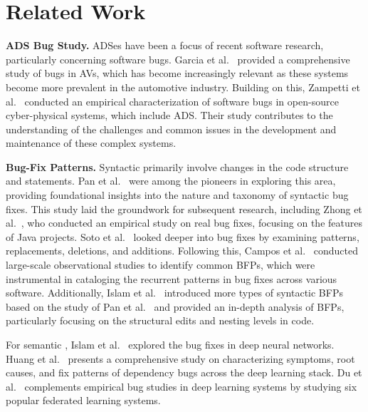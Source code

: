 \section{Related Work}\label{sec:related}

\noindent \textbf{ADS Bug Study.} ADSes have been a focus of recent software research, particularly concerning software bugs. Garcia et al.~\cite{GarciaF0AXC20} provided a comprehensive study of bugs in AVs, which has become increasingly relevant as these systems become more prevalent in the automotive industry. 
Building on this, Zampetti et al.~\cite{ZampettiKPP22} conducted an empirical characterization of software bugs in open-source cyber-physical systems, which include ADS. Their study contributes to the understanding of the challenges and common issues in the development and maintenance of these complex systems.

\noindent \textbf{Bug-Fix Patterns.} Syntactic \bfps primarily involve changes in the code structure and statements.
Pan et al.~\cite{PanKW09} were among the pioneers in exploring this area, providing foundational insights into the nature and taxonomy of syntactic bug fixes. This study laid the groundwork for subsequent research, including Zhong et al.~\cite{ZhongS15}, who conducted an empirical study on real bug fixes, focusing on the features of Java projects. 
Soto et al.~\cite{SotoTWGL16} looked deeper into bug fixes by examining patterns, replacements, deletions, and additions. 
Following this, Campos et al.~\cite{CamposM17,CamposM19} conducted large-scale observational studies to identify common BFPs, which were instrumental in cataloging the recurrent patterns in bug fixes across various software.
Additionally, Islam et al.~\cite{IslamZ20} introduced more types of syntactic BFPs based on the study of Pan et al.~\cite{PanKW09} and provided an in-depth analysis of BFPs, particularly focusing on the structural edits and nesting levels in code. 

For semantic \bfps, Islam et al.~\cite{IslamPNR20} explored the bug fixes in deep neural networks. 
Huang et al.~\cite{Huang0WCM023} presents a comprehensive study on characterizing symptoms, root causes, and fix patterns of dependency bugs across the deep learning stack.
Du et al.~\cite{DuCC0C023} complements empirical bug studies in deep learning systems by studying six popular federated learning systems.

